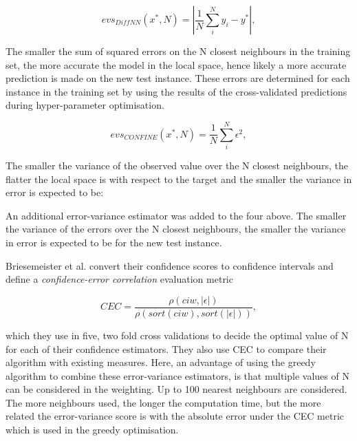 \documentclass[10pt]{bmc_article}
\newenvironment{bmcformat}{\begin{raggedright}\baselineskip20pt\sloppy\setboolean{publ}{false}}{\end{raggedright}\baselineskip20pt\sloppy}
\begin{document}
\begin{bmcformat}
\begin{equation}
evs_{DiffNN}(x^*, N) = |\frac{1}{N}\sum_i^N{y_i} - y^*|,
\end{equation}

The smaller the sum of squared errors on the N closest neighbours in the training set, the more accurate the model in the local space, hence likely a more accurate prediction is made on the new test instance. These errors are determined for each instance in the training set by using the results of the cross-validated predictions during hyper-parameter optimisation.

\begin{equation}
evs_{CONFINE}(x^*, N) = \frac{1}{N}\sum_i^N{\epsilon^2},
\end{equation}

The smaller the variance of the observed value over the N closest neighbours, the flatter the local space is with respect to the target and the smaller the variance in error is expected to be:


An additional error-variance estimator was added to the four above. The smaller the variance of the errors over the N closest neighbours, the smaller the variance in error is expected to be for the new test instance.


Briesemeister et al. \cite{briesemeister_no_2012} convert their confidence scores to confidence intervals and define a \textit{confidence-error correlation} evaluation metric

\begin{equation}
CEC = \frac{\rho(ciw,|\epsilon|)}{\rho(sort(ciw),sort(|\epsilon|))},
\end{equation}

which they use in five, two fold cross validations to decide the optimal value of N for each of their confidence estimators. They also use CEC to compare their algorithm with existing measures. Here, an advantage of using the greedy algorithm to combine these error-variance estimators, is that multiple values of N can be considered in the weighting. Up to 100 nearest neighbours are considered. The more neighbours used, the longer the computation time, but the more related the error-variance score is with the absolute error under the CEC metric which is used in the greedy optimisation. 





\end{bmcformat}
\end{document}
